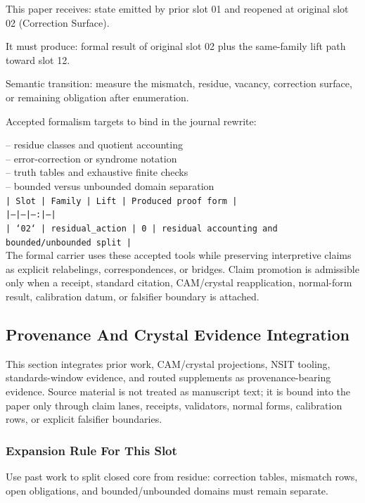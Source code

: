 \documentclass[11pt]{article}
\begin{document}
This paper receives: state emitted by prior slot 01 and reopened at original slot 02 (Correction Surface).

It must produce: formal result of original slot 02 plus the same-family lift path toward slot 12.

Semantic transition: measure the mismatch, residue, vacancy, correction surface, or remaining obligation after enumeration.

Accepted formalism targets to bind in the journal rewrite:

\noindent{}-- residue classes and quotient accounting\\
\noindent{}-- error-correction or syndrome notation\\
\noindent{}-- truth tables and exhaustive finite checks\\
\noindent{}-- bounded versus unbounded domain separation\\

\noindent\texttt{| Slot | Family | Lift | Produced proof form |}\\
\noindent\texttt{|---|---|---:|---|}\\
\noindent\texttt{| `02` | residual\_action | 0 | residual accounting and bounded/unbounded split |}\\

The formal carrier uses these accepted tools while preserving interpretive
claims as explicit relabelings, correspondences, or bridges. Claim promotion is admissible only when a receipt, standard citation,
CAM/crystal reapplication, normal-form result, calibration datum, or falsifier
boundary is attached.

\subsection*{Provenance And Crystal Evidence Integration}

This section integrates prior work, CAM/crystal projections, NSIT tooling,
standards-window evidence, and routed supplements as provenance-bearing
evidence. Source material is not treated as manuscript text; it is bound into
the paper only through claim lanes, receipts, validators, normal forms,
calibration rows, or explicit falsifier boundaries.

\subsubsection*{Expansion Rule For This Slot}

Use past work to split closed core from residue: correction tables, mismatch rows, open obligations, and bounded/unbounded domains must remain separate.
\end{document}
